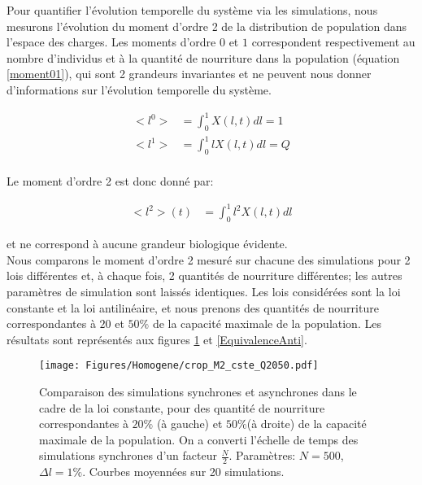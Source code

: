 Pour quantifier l'évolution temporelle du système via les simulations, nous mesurons l'évolution du moment d'ordre 2 de la distribution de population dans l'espace des charges. Les moments d'ordre $0$ et $1$ correspondent respectivement au nombre d'individus et à la quantité de nourriture dans la population (équation \ref{moment01}), qui sont 2 grandeurs invariantes et ne peuvent nous donner d'informations sur l'évolution temporelle du système.

\begin{equation}
\begin{aligned}
<l^0> &= \int_0^1 X(l,t) dl = 1\\
<l^1> &= \int_0^1 l X(l,t) dl = Q\\
\end{aligned}
\label{moment01}
\end{equation}

Le moment d'ordre 2 est donc donné par:

\begin{equation}
\begin{aligned}
<l^2>(t) &= \int_0^1 l^2 X(l,t) dl 
\end{aligned}
\label{moment2continu}
\end{equation}

et ne correspond à aucune grandeur biologique évidente.\\

Nous comparons le moment d'ordre 2 mesuré sur chacune des simulations pour 2 lois différentes et, à chaque fois, 2 quantités de nourriture différentes; les autres paramètres de simulation sont laissés identiques. Les lois considérées sont la loi constante et la loi antilinéaire, et nous prenons des quantités de nourriture correspondantes à $20$ et $50\%$ de la capacité maximale de la population. Les résultats sont représentés aux figures \ref{EquivalenceCste} et \ref{EquivalenceAnti}.


\begin{figure}[h]
\centering
\texttt{[image: Figures/Homogene/crop\_M2\_cste\_Q2050.pdf]}
\caption{Comparaison des simulations synchrones et asynchrones dans le cadre de la loi constante, pour des quantité de nourriture correspondantes à $20\%$ (à gauche) et $50\%$(à droite) de la capacité maximale de la population. On a converti l'échelle de temps des simulations synchrones d'un facteur $\frac{N}{2}$. Paramètres: $N=500$, $\Delta l = 1\%$. Courbes moyennées sur 20 simulations.}
\label{EquivalenceCste}
\end{figure}

